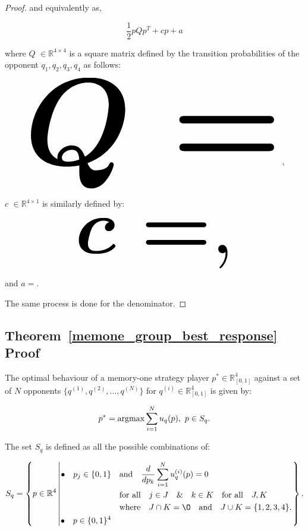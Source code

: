 \documentclass[10pt]{article}
\newcommand{\R}{\mathbb{R}}
\begin{document}
\begin{proof}
    and equivalently as,

    \[\frac{1}{2}pQp^T + cp + a\]

    where \(Q\) \(\in \R^{4\times4}\) is a square matrix defined by the
    transition probabilities of the opponent \(q_1, q_2, q_3, q_4\) as follows:

    \begin{equation*}
        \resizebox{0.9\linewidth}{!}{\arraycolsep=2.5pt%
        \boldmath\(
        Q = \)},
    \end{equation*}

    \(c\) \(\in \R^{4 \times 1}\) is similarly defined by:

    \begin{equation*}
        \resizebox{0.55\linewidth}{!}{\arraycolsep=2.5pt%
        \boldmath\(c = \),}
    \end{equation*}

    and \(a = \).

    The same process is done for the denominator.
\end{proof}

\subsection{Theorem~\ref{memone_group_best_response} Proof}\label{appendix:memone_group_best_response}
The optimal behaviour of a memory-one strategy player \(p^* \in \R_{[0, 1]} ^
4\) against a set of \(N\) opponents \(\{q^{(1)}, q^{(2)}, \dots, q^{(N)} \}\)
for \(q^{(i)} \in \R_{[0, 1]} ^ 4\) is given by:

\[p^* = \textnormal{argmax}\sum\limits_{i=1} ^ N  u_q(p), \ p \in S_q.\]

The set \(S_q\) is defined as all the possible combinations of:

\begin{equation}\label{eq:s_q_set}
    S_q =
    \left\{p \in \mathbb{R} ^ 4 \left|
        \begin{aligned}
            \bullet\quad p_j \in \{0, 1\} & \quad \text{and} \quad \frac{d}{dp_k}
            \sum\limits_{i=1} ^ N  u_q^{(i)}(p) = 0 \\
            & \quad \text{for all} \quad j \in J \quad \&  \quad k \in K  \quad \text{for all} \quad J, K \\
            & \quad \text{where} \quad J \cap K = \O \quad
            \text{and} \quad J \cup K = \{1, 2, 3, 4\}.\\
            \bullet\quad  p \in \{0, 1\} ^ 4
        \end{aligned}\right.
    \right\}.
\end{equation}
\end{document}
